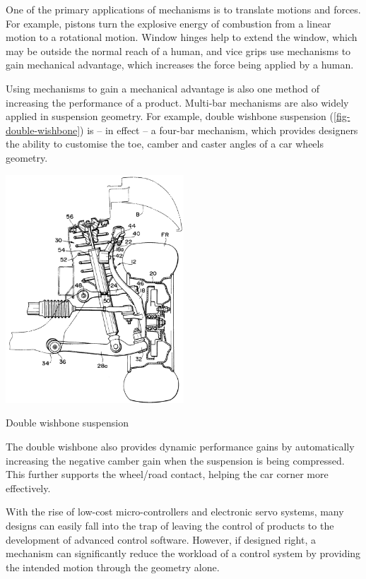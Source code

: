 One of the primary applications of mechanisms is to translate motions and forces. For example, pistons turn the explosive energy of combustion from a linear motion to a rotational motion. Window hinges help to extend the window, which may be outside the normal reach of a human, and vice grips use mechanisms to gain mechanical advantage, which increases the force being applied by a human.

Using mechanisms to gain a mechanical advantage is also one method of increasing the performance of a product. Multi-bar mechanisms are also widely applied in suspension geometry. For example, double wishbone suspension (\cref{fig-double-wishbone}) is -- in effect -- a four-bar mechanism, which provides designers the ability to customise the toe, camber and caster angles of a car wheels geometry. 

\begin{marginfigure}[-1em]
  \centering
  \includegraphics[width=0.5\textwidth]{figs/DoubleWishbone.png}
  \caption{Double wishbone suspension}
  \label{fig-double-wishbone}
\end{marginfigure}

The double wishbone also provides dynamic performance gains by automatically increasing the negative camber gain when the suspension is being compressed. This further supports the wheel/road contact, helping the car corner more effectively.

With the rise of low-cost micro-controllers and electronic servo systems, many designs can easily fall into the trap of leaving the control of products to the development of advanced control software. However, if designed right, a mechanism can significantly reduce the workload of a control system by providing the intended motion through the geometry alone.


